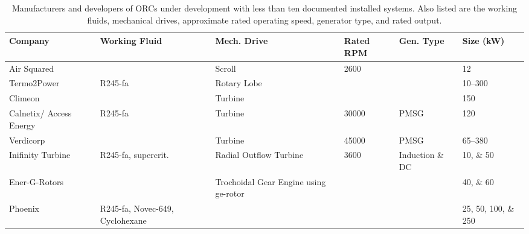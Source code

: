 \begin{table}
\centering
\caption{Manufacturers and developers of ORCs under development with less than ten documented installed systems. Also listed are the working fluids, mechanical drives, approximate rated operating speed, generator type, and rated output.}
\label{tab:orc_manufacturers_dev}

\begin{tabular}[c]{p{2.7cm}p{2.8cm}p{2.0cm}p{1.5cm}p{1.6cm}p{2.0cm}}%
	\toprule
	\textbf{Company}		& \textbf{Working Fluid}		& \textbf{Mech. Drive} 		& \textbf{Rated RPM}	& \textbf{Gen. Type}	& \textbf{Size (kW)}  \\
	\midrule
	Air Squared				& 									& Scroll					& 2600 			& 						& 12 \\ 
	Termo2Power				& R245-fa							& Rotary Lobe				& 				& 						& \numrange{10}{300} \\ 
	Climeon					& 									& Turbine					& 				& 						& 150 \\ 
	Calnetix/ Access Energy	& R245-fa							& Turbine					& 30000			& PMSG					& 120 \\ 
	Verdicorp				&									& Turbine					& 45000			& PMSG 					& \numrange{65}{380} \\ 
	Inifinity Turbine		& R245-fa, supercrit. \ch{CO2}		& Radial Outflow Turbine	& 3600			& Induction \& DC 		& \numlist{10;50} \\ 
	Ener-G-Rotors			& 									& Trochoidal Gear Engine using ge-rotor &	&  						& \numlist{40;60} \\ 
	Phoenix					& R245-fa, Novec-649, Cyclohexane	& 							& 				& 						& \numlist{25;50;100;250} \\ \bottomrule
\end{tabular}
\end{table}
	
